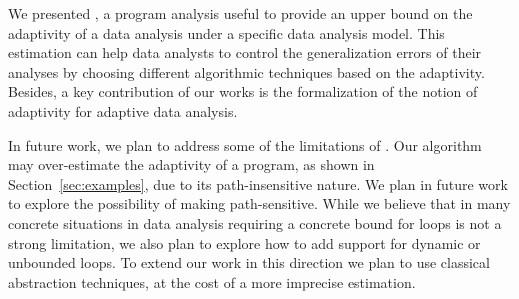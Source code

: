 We presented {\THESYSTEM}, a program analysis useful to provide an upper bound on the adaptivity of a data analysis under a specific data analysis model. This estimation can help data analysts to control the generalization errors of their analyses by choosing different algorithmic techniques based on the adaptivity. Besides, a key contribution of our works is the formalization of the notion of adaptivity for adaptive data analysis. 

In future work, we plan to address some of the limitations of {\THESYSTEM}. Our algorithm may over-estimate the adaptivity of a program, as shown in Section~\ref{sec:examples}, due to its path-insensitive nature. We plan in future work to explore the possibility of making {\THESYSTEM} path-sensitive. While we believe that in many concrete situations in data analysis requiring a concrete bound for loops is not a strong limitation, we also plan to explore how to add support for dynamic or unbounded loops. To extend our work in this direction we plan to use classical abstraction techniques, at the cost of a more imprecise estimation.  
